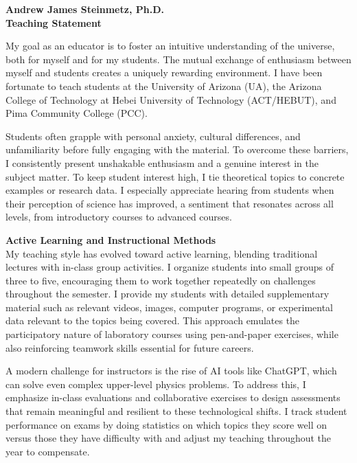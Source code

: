 \documentclass[11pt]{article}
\begin{document}
\newpage

\begin{center}
    {\Large\textbf{Andrew James Steinmetz, Ph.D.}}\\[0.5em]
    {\large\textbf{Teaching Statement}}
\end{center}

My goal as an educator is to foster an intuitive understanding of the universe, both for myself and for my students. The mutual exchange of enthusiasm between myself and students creates a uniquely rewarding environment. I have been fortunate to teach students at the University of Arizona (UA), the Arizona College of Technology at Hebei University of Technology (ACT/HEBUT), and Pima Community College (PCC).

Students often grapple with personal anxiety, cultural differences, and unfamiliarity before fully engaging with the material. To overcome these barriers, I consistently present unshakable enthusiasm and a genuine interest in the subject matter. To keep student interest high, I tie theoretical topics to concrete examples or research data. I especially appreciate hearing from students when their perception of science has improved, a sentiment that resonates across all levels, from introductory courses to advanced courses.

{\large\textbf{Active Learning and Instructional Methods}}\\
My teaching style has evolved toward active learning, blending traditional lectures with in-class group activities. I organize students into small groups of three to five, encouraging them to work together repeatedly on challenges throughout the semester. I provide my students with detailed supplementary material such as relevant videos, images, computer programs, or experimental data relevant to the topics being covered. This approach emulates the participatory nature of laboratory courses using pen-and-paper exercises, while also reinforcing teamwork skills essential for future careers. 

A modern challenge for instructors is the rise of AI tools like ChatGPT, which can solve even complex upper-level physics problems. To address this, I emphasize in-class evaluations and collaborative exercises to design assessments that remain meaningful and resilient to these technological shifts. I track student performance on exams by doing statistics on which topics they score well on versus those they have difficulty with and adjust my teaching throughout the year to compensate.
\end{document}

